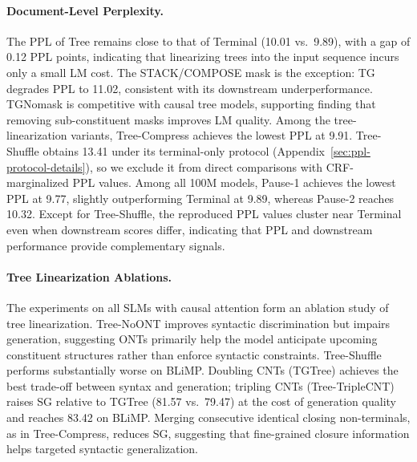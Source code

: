 \documentclass[11pt]{article}
\begin{document}
\paragraph{Document-Level Perplexity.}
The PPL of Tree remains close to that of Terminal (10.01 vs.\ 9.89), with a gap of 0.12 PPL points, indicating that linearizing trees into the input sequence incurs only a small LM cost.
The STACK/COMPOSE mask is the exception: TG degrades PPL to 11.02, consistent with its downstream underperformance.
TGNomask is competitive with causal tree models, supporting  finding that removing sub-constituent masks improves LM quality.
Among the tree-linearization variants, Tree-Compress achieves the lowest PPL at 9.91. Tree-Shuffle obtains 13.41 under its terminal-only protocol (Appendix~\ref{sec:ppl-protocol-details}), so we exclude it from direct comparisons with CRF-marginalized PPL values.
Among all 100M models, Pause-1 achieves the lowest PPL at 9.77, slightly outperforming Terminal at 9.89, whereas Pause-2 reaches 10.32.
Except for Tree-Shuffle, the reproduced PPL values cluster near Terminal even when downstream scores differ, indicating that PPL and downstream performance provide complementary signals.


\paragraph{Tree Linearization Ablations. }
The experiments on all SLMs with causal attention form an ablation study of tree linearization.
Tree-NoONT improves syntactic discrimination but impairs generation, suggesting ONTs primarily help the model anticipate upcoming constituent structures rather than enforce syntactic constraints. Tree-Shuffle performs substantially worse on BLiMP. Doubling CNTs (TGTree) achieves the best trade-off between syntax and generation; tripling CNTs (Tree-TripleCNT) raises SG relative to TGTree (81.57 vs.\ 79.47) at the cost of generation quality and reaches 83.42 on BLiMP. Merging consecutive identical closing non-terminals, as in Tree-Compress, reduces SG, suggesting that fine-grained closure information helps targeted syntactic generalization.
\end{document}
